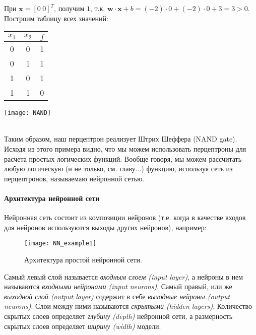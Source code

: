 При $\bm{x} = \left[ 0 \hspace{3pt} 0 \right]^T$, получим $1$, т.к. 
$\bm{w} \cdot \bm{x} + b = (-2) \cdot 0 + (-2) \cdot 0 + 3 = 3 > 0$.
Построим таблицу всех значений:

\begin{minipage}{0.4\textwidth}
    \centering
    \renewcommand{\arraystretch}{1.5}
    \begin{tabular}{ccc}
        $x_1$ & $x_2$ & $f$ \\
        \midrule
        0 & 0 & 1 \\
        0 & 1 & 1 \\
        1 & 0 & 1 \\
        1 & 1 & 0 \\
    \end{tabular}
    \label{tab:perceptron-values}
\end{minipage}
\hspace{30pt}
\begin{minipage}{0.4\textwidth}
    \texttt{[image: NAND]}
    \label{fig:NAND}
\end{minipage}\\

Таким образом, наш перцептрон реализует Штрих Шеффера (NAND gate). 
Исходя из этого примера видно, что мы можем использовать перцептроны для 
расчета простых логических функций. Вообще говоря, мы можем рассчитать любую логическую 
(и не только, см. {\color{red} главу...}) функцию, 
используя сеть из перцептронов, называемаю нейронной сетью.

\paragraph{Архитектура нейронной сети}

Нейронная сеть состоит из композиции нейронов (т.е. когда в качестве входов для 
нейронов используются выходы других нейронов), например:

\begin{figure}[h!]
    \centering
    \texttt{[image: NN\_example1]}
    \caption{Архитектура простой нейронной сети.}
    \label{fig:NN1}
\end{figure}

Самый левый слой называется \textit{входным слоем (input layer)}, а нейроны в нем 
называются \textit{входными нейронами (input neurons)}. Самый правый, или же 
\textit{выходной слой (output layer)} содержит в себе 
\textit{выходные нейроны (output neurons)}. Слои между ними называются 
\textit{скрытыми (hidden layers)}. Количество скрытых слоев определяет 
\textit{глубину (depth)} нейронной сети, а размерность скрытых слоев 
определяет \textit{ширину (width)} модели.

